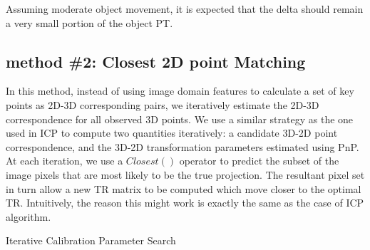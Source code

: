 \documentclass[journal]{IEEEtran}
\begin{document}
Assuming moderate object movement, it is expected that the delta should remain a very small portion of the object PT. 

\subsection{method \#2: Closest 2D point Matching}
In this method, instead of using image domain features to calculate a set of key points as 2D-3D corresponding pairs, we iteratively estimate the 2D-3D correspondence for all observed 3D points. We use a similar strategy as the one used in ICP \cite{icp} to compute two quantities iteratively: a candidate 3D-2D point correspondence, and the 3D-2D transformation parameters estimated using PnP. At each iteration, we use a $Closest()$ operator to predict the subset of the image pixels that are most likely to be the true projection. The resultant pixel set in turn allow a new TR matrix to be computed which move closer to the optimal TR. Intuitively, the reason this might work is exactly the same as the case of ICP algorithm. 

\begin{algorithm}[!htbp]
	\caption{Iterative Calibration Parameter Search}
	\label{alg:model}

\end{algorithm}
\end{document}
